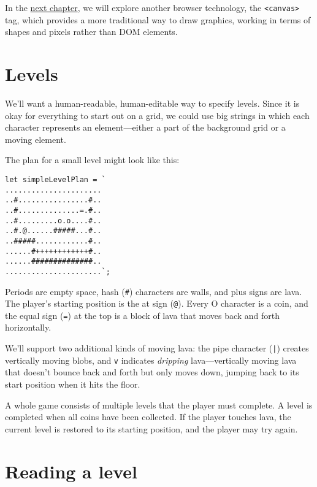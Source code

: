 In the \hyperref[canvas]{next chapter}, we will explore another browser technology, the \lstinline`<canvas>` tag, which provides a more traditional way to draw graphics, working in terms of shapes and pixels rather than DOM elements.

\section{Levels}

We'll want a human-readable, human-editable way to specify levels. Since it is okay for everything to start out on a grid, we could use big strings in which each character represents an element—either a part of the background grid or a moving element.

The plan for a small level might look like this:

\begin{lstlisting}
let simpleLevelPlan = `
......................
..#................#..
..#..............=.#..
..#.........o.o....#..
..#.@......#####...#..
..#####............#..
......#++++++++++++#..
......##############..
......................`;
\end{lstlisting}
\noindent{}

Periods are empty space, hash (\lstinline`#`) characters are walls, and plus signs are lava. The player's starting position is the at sign (\lstinline`@`). Every O character is a coin, and the equal sign (\lstinline`=`) at the top is a block of lava that moves back and forth horizontally.

We'll support two additional kinds of moving lava: the pipe character (\lstinline`|`) creates vertically moving blobs, and \lstinline`v` indicates \emph{dripping} lava—vertically moving lava that doesn't bounce back and forth but only moves down, jumping back to its start position when it hits the floor.

A whole game consists of multiple levels that the player must complete. A level is completed when all coins have been collected. If the player touches lava, the current level is restored to its starting position, and the player may try again.

\label{game.level}\section{Reading a level}

